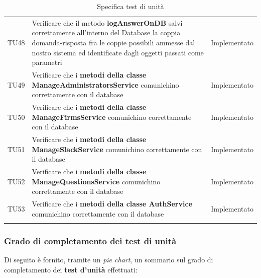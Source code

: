 \documentclass[../PianoDiQualifica_v4.0.0.tex]{subfiles}
\begin{document}
\begin{longtable}[c] { >{\centering\arraybackslash}p{2cm} p{9cm} >{\centering\arraybackslash}p{4cm}}
			\addlinespace[0.3em]
			\midrule
			\addlinespace[0.3em]
			TU48 & Verificare che il metodo \textbf{logAnswerOnDB} salvi correttamente all'interno del Database la coppia domanda-risposta fra le coppie possibili ammesse dal nostro sistema ed identificate dagli oggetti passati come parametri & Implementato \\
			\addlinespace[0.3em]
			\midrule
			\addlinespace[0.3em]
			TU49 & Verificare che i \textbf{metodi della classe ManageAdministratorsService} comunichino correttamente con il database & Implementato \\
			\addlinespace[0.3em]
			\midrule
			\addlinespace[0.3em]
			TU50 & Verificare che i \textbf{metodi della classe ManageFirmsService} comunichino correttamente con il database & Implementato \\
			\addlinespace[0.3em]
			\midrule
			\addlinespace[0.3em]
			TU51 & Verificare che i \textbf{metodi della classe ManageSlackService} comunichino correttamente con il database & Implementato \\
			\addlinespace[0.3em]
			\midrule
			\addlinespace[0.3em]
			TU52 & Verificare che i \textbf{metodi della classe ManageQuestionsService} comunichino correttamente con il database & Implementato \\
			\addlinespace[0.3em]
			\midrule
			\addlinespace[0.3em]
			TU53 & Verificare che i \textbf{metodi della classe AuthService} comunichino correttamente con il database & Implementato \\
		\bottomrule
		\caption{Specifica test di unità}
	\end{longtable}

		\vspace*{1cm}
		\subsubsection{Grado di completamento dei test di unità}

		Di seguito è fornito, tramite un \textit{pie chart}, un sommario sul grado di completamento dei \textbf{test d'unità} effettuati:
\end{document}
